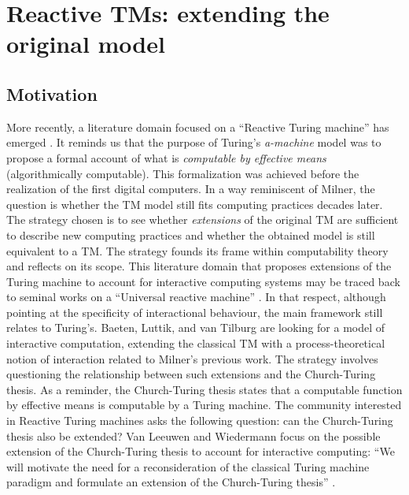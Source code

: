\documentclass[a4paper, 11pt, twoside]{article}
\begin{document}
\section{Reactive TMs: extending the original model}
\label{RTMS}

\subsection{Motivation}

More recently, a literature domain focused on a ``Reactive Turing machine'' has emerged 
\parencite{Andersen1997, Baeten2012, Baeten2013, Luttik2016, VanLeeuwen2006}. It reminds us that the purpose of Turing's \textit{a-machine} model was to propose a formal account of what is \textit{computable by effective means} (algorithmically computable). This formalization was achieved before the realization of the first digital computers. In a way reminiscent of Milner, the question is whether the TM model still fits computing practices decades later. The strategy chosen is to see whether \textit{extensions} of the original TM are sufficient to describe new computing practices and whether the obtained model is still equivalent to a TM. The strategy founds its frame within computability theory and reflects on its scope.
This literature domain that proposes extensions of the Turing machine to account for interactive computing systems may be traced back to seminal works on a ``Universal reactive machine'' \parencite{Andersen1997}. In that respect, although pointing at the specificity of interactional behaviour, the main framework still relates to Turing's. Baeten, Luttik, and van Tilburg \parencite{Baeten2013} are looking for a  model of interactive computation, extending the classical TM with a process-theoretical notion of interaction related to Milner's previous work. 
The strategy involves questioning the relationship between such extensions and the Church-Turing thesis. As a reminder, the Church-Turing thesis states that a computable function by effective means is computable by a Turing machine. The community interested in Reactive Turing machines asks the following question: can the Church-Turing thesis also be extended? Van Leeuwen and Wiedermann \parencite*{VanLeeuwen2001} focus on the possible extension of the Church-Turing thesis to account for interactive computing: ``We will motivate the need for a reconsideration of the classical Turing machine paradigm and formulate an extension of the Church-Turing thesis'' \parencite{VanLeeuwen2001}. 
\end{document}
